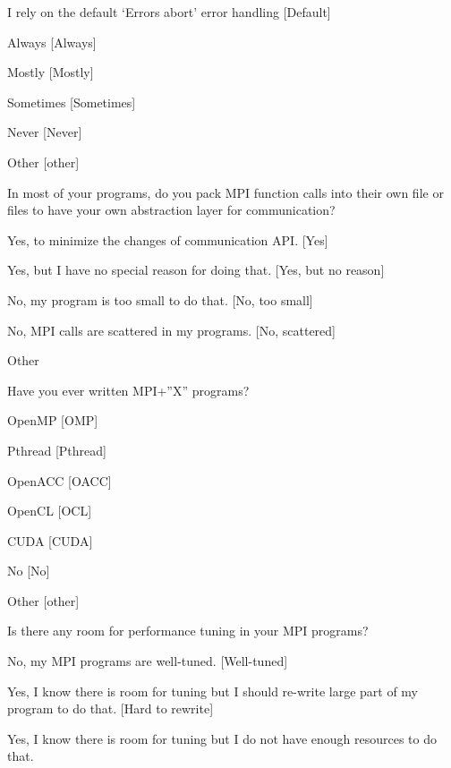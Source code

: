 \documentclass[conference,10pt,letterpaper]{IEEEtran}
\begin{document}
{{\begin{description}
    \begin{inparaenum}[{\bf C}1)]
    \item I rely on the default ‘Errors abort’ error handling [Default]
    \item Always [Always]
    \item Mostly [Mostly]
    \item Sometimes [Sometimes]
    \item Never [Never]
    \item Other [other]
    \end{inparaenum}
  \item[Q21:] In most of your programs, do you pack MPI function calls into their own file or files to have your own abstraction layer for communication?
    \begin{inparaenum}[{\bf C}1)]
    \item Yes, to minimize the changes of communication API. [Yes]
    \item Yes, but I have no special reason for doing that. [Yes, but no reason]
    \item No, my program is too small to do that. [No, too small]
    \item No, MPI calls are scattered in my programs. [No, scattered]
    \item Other
    \end{inparaenum}
  \item[Q22*:] Have you ever written MPI+”X” programs?
    \begin{inparaenum}[{\bf C}1)]
    \item OpenMP [OMP]
    \item Pthread [Pthread]
    \item OpenACC [OACC]
    \item OpenCL [OCL]
    \item CUDA [CUDA]
    \item No [No]
    \item Other [other]
    \end{inparaenum}
  \item[Q23:] Is there any room for performance tuning in your MPI programs?
    \begin{inparaenum}[{\bf C}1)]
    \item No, my MPI programs are well-tuned. [Well-tuned]
    \item Yes, I know there is room for tuning but I should re-write large
      part of my program to do that. [Hard to rewrite]
    \item Yes, I know there is room for tuning but I do not have enough resources to do that.

\end{inparaenum}
\end{description}}}
\end{document}
